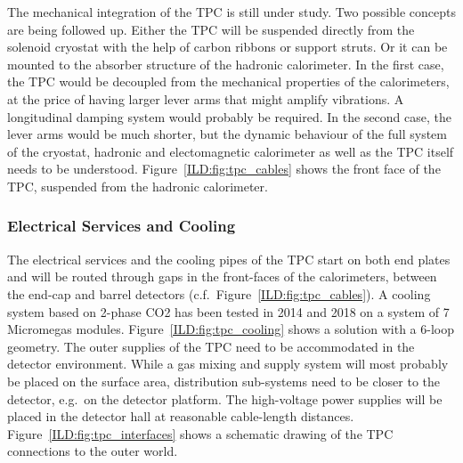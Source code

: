 The mechanical integration of the TPC is still under study. Two possible concepts are being followed up. Either the TPC will be suspended directly from the solenoid cryostat with the help of carbon ribbons or support struts. Or it can be mounted to the absorber structure of the hadronic calorimeter. In the first case, the TPC would be decoupled from the mechanical properties of the calorimeters, at the price of having larger lever arms that might amplify vibrations. A longitudinal damping system would probably be required. In the second case, the lever arms would be much shorter, but the dynamic behaviour of the full system of the cryostat, hadronic and electomagnetic calorimeter as well as the TPC itself needs to be understood. Figure~\ref{ILD:fig:tpc_cables} shows the front face of the TPC, suspended from the hadronic calorimeter.

\subsubsection{Electrical Services and Cooling}

The electrical services and the cooling pipes of the TPC start on both end plates and will be routed through gaps in the front-faces of the calorimeters, between the end-cap and barrel detectors (c.f.~Figure~\ref{ILD:fig:tpc_cables}). A cooling system based on 2-phase CO2 has been tested in 2014 and 2018 on a system of
7 Micromegas modules. Figure~\ref{ILD:fig:tpc_cooling} shows a solution with a 6-loop geometry. The outer supplies of the TPC need to be accommodated in the detector environment. While a gas mixing and supply system will most probably be placed on the surface area, distribution sub-systems need to be closer to the detector, e.g.~on the detector platform. The high-voltage power supplies will be placed in the detector hall at reasonable cable-length distances. Figure~\ref{ILD:fig:tpc_interfaces} shows a schematic drawing of the TPC connections to the outer world.

